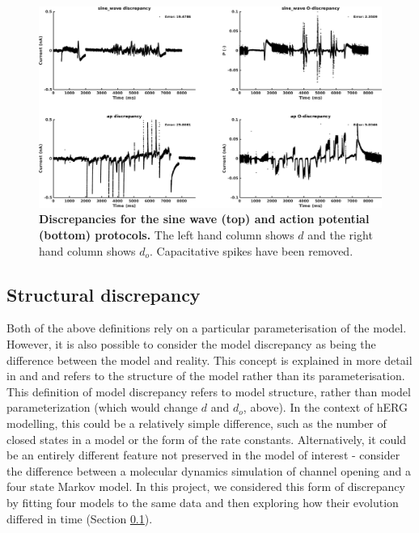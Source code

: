 \documentclass[11pt,a4paper,oneside]{article}
\begin{document}
\begin{figure}[t]
\begin{center}
\includegraphics[scale=0.42]{Figures/PlotDiscrepancyVsDiscrepancyInOpen_sine_wave_ap.png}
\caption{\textbf{Discrepancies for the sine wave (top) and action potential (bottom) protocols.} The left hand column shows $d$ and the right hand column shows $d_o$. Capacitative spikes have been removed.}
\label{Fig_Discrepancy}
\end{center}
\end{figure}


\subsection{Structural discrepancy}
Both of the above definitions rely on a particular parameterisation of the model. However, it is also possible to consider the model discrepancy as being the difference between the model and reality. This concept is explained in more detail in \cite{Kennedy2001} and \cite{Strong2014} and refers to the structure of the model rather than its parameterisation.  This definition of model discrepancy refers to model structure, rather than model parameterization (which would change $d$ and $d_o$, above). In the context of hERG modelling, this could be a relatively simple difference, such as the number of closed states in a model or the form of the rate constants. Alternatively, it could be an entirely different feature not preserved in the model of interest - consider the difference between a molecular dynamics simulation of channel opening and a four state Markov model. In this project, we considered this form of discrepancy by fitting four models to the same data and then exploring how their evolution differed in time (Section \ref{}).
\end{document}
